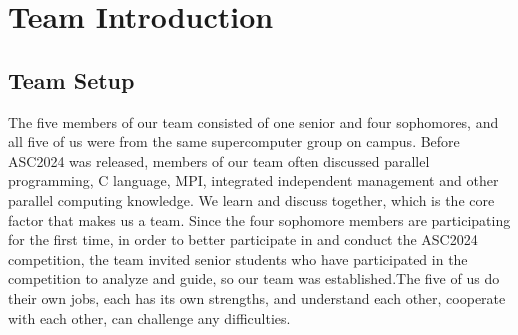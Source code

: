 \documentclass[a4paper,12pt]{article}
\begin{document}
\newpage

\section{Team Introduction}

\subsection{Team Setup}
The five members of our team consisted of one senior and four sophomores, and all five of us were from the same supercomputer group on campus. Before ASC2024 was released, members of our team often discussed parallel programming, C language, MPI, integrated independent management and other parallel computing knowledge. We learn and discuss together, which is the core factor that makes us a team. Since the four sophomore members are participating for the first time, in order to better participate in and conduct the ASC2024 competition, the team invited senior students who have participated in the competition to analyze and guide, so our team was established.The five of us do their own jobs, each has its own strengths, and understand each other, cooperate with each other, can challenge any difficulties.
\end{document}
